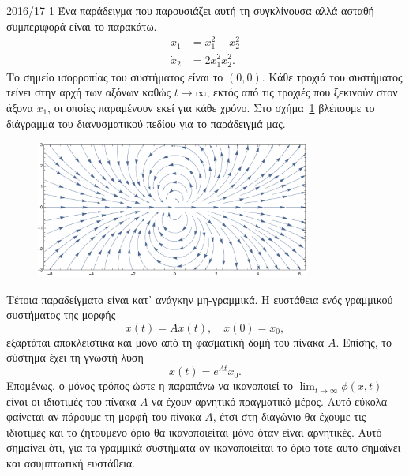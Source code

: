 \begin{solution}{2016/17 1}
    Ένα παράδειγμα που παρουσιάζει αυτή τη συγκλίνουσα αλλά ασταθή συμπεριφορά
    είναι το παρακάτω.
    \begin{align*}
        \dot{x}_1 &= x_1^2 - x_2^2 \\
        \dot{x}_2 &= 2x_1^2x_2^2.
    \end{align*}
    Το σημείο ισορροπίας του συστήματος είναι το \( (0, 0) \). Κάθε τροχιά του
    συστήματος τείνει στην αρχή των αξόνων καθώς \( t \to \infty \), εκτός από
    τις τροχιές που ξεκινούν στον άξονα \( x_1 \), οι οποίες παραμένουν εκεί για
    κάθε χρόνο. Στο σχήμα~\ref{fig:ex1_unstable_convergent_example} βλέπουμε το
    διάγραμμα του διανυσματικού πεδίου για το παράδειγμά μας.
    \begin{figure}[h]
        \centering
        \includegraphics[width=0.8\textwidth]{figures/ex1_unstableConvergentExample.pdf}
        \caption{}
        \label{fig:ex1_unstable_convergent_example}
    \end{figure}

    Τέτοια παραδείγματα είναι κατ᾽ ανάγκην μη-γραμμικά. Η ευστάθεια ενός
    γραμμικού συστήματος της μορφής
    \begin{equation*}
        \dot{x}(t) = Ax(t), \quad x(0) = x_0,
    \end{equation*}
    εξαρτάται αποκλειστικά και μόνο από τη φασματική δομή του πίνακα \( A \).
    Επίσης, το σύστημα έχει τη γνωστή λύση
    \begin{equation*}
        x(t) = e^{At}x_0.
    \end{equation*}
    Επομένως, ο μόνος τρόπος ώστε η παραπάνω να ικανοποιεί το \( \lim_{t \to
    \infty} \phi(x, t) \) είναι οι ιδιοτιμές του πίνακα \( A \) να έχουν
    αρνητικό πραγματικό μέρος. Αυτό εύκολα φαίνεται αν πάρουμε τη μορφή
     του πίνακα \( A \), έτσι στη διαγώνιο θα έχουμε τις ιδιοτιμές
    και το ζητούμενο όριο θα ικανοποιείται μόνο όταν είναι αρνητικές. Αυτό
    σημαίνει ότι, για τα γραμμικά συστήματα αν ικανοποιείται το όριο τότε αυτό
    σημαίνει και ασυμπτωτική ευστάθεια.
\end{solution}
